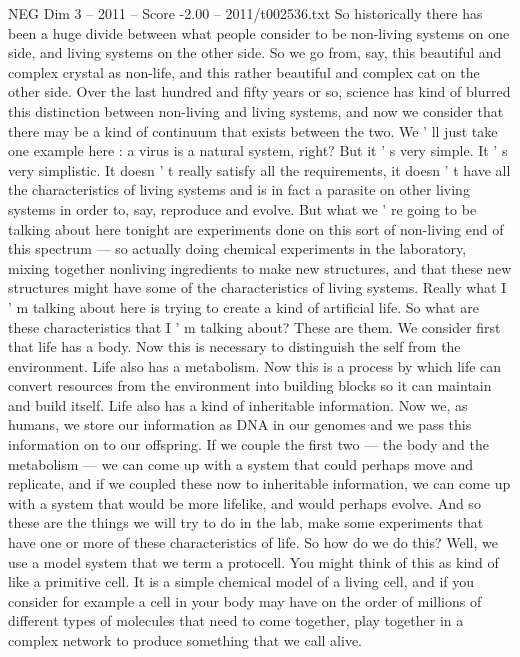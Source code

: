 \begin{textsample}{NEG Dim 3 – 2011 – Score -2.00 – 2011/t002536.txt}  \label{ex:f3_neg_024}
So historically there has been a huge divide between what people consider to be non-living systems on one side, and living systems on the other side.
So we go from, say, this beautiful and complex crystal as non-life, and this rather beautiful and complex cat on the other side.
Over the last hundred and fifty years or so, science has kind of blurred this distinction between non-living and living systems, and now we consider that there may be a kind of continuum that exists between the two.
We ' ll just take one example here : a virus is a natural system, right?
But it ' s very simple.
It ' s very simplistic.
It doesn ' t really satisfy all the requirements, it doesn ' t have all the characteristics of living systems and is in fact a parasite on other living systems in order to, say, reproduce and evolve.
But what we ' re going to be talking about here tonight are experiments done on this sort of non-living end of this spectrum — so actually doing chemical experiments in the laboratory, mixing together nonliving ingredients to make new structures, and that these new structures might have some of the characteristics of living systems.
Really what I ' m talking about here is trying to create a kind of artificial life.
So what are these characteristics that I ' m talking about?
These are them.
We consider first that life has a body.
Now this is necessary to distinguish the self from the environment.
Life also has a metabolism.
Now this is a process by which life can convert resources from the environment into building blocks so it can maintain and build itself.
Life also has a kind of inheritable information.
Now we, as humans, we store our information as DNA in our genomes and we pass this information on to our offspring.
If we couple the first two — the body and the metabolism — we can come up with a system that could perhaps move and replicate, and if we coupled these now to inheritable information, we can come up with a system that would be more lifelike, and would perhaps evolve.
And so these are the things we will try to do in the lab, make some experiments that have one or more of these characteristics of life.
So how do we do this?
Well, we use a model system that we term a protocell.
You might think of this as kind of like a primitive cell.
It is a simple chemical model of a living cell, and if you consider for example a cell in your body may have on the order of millions of different types of molecules that need to come together, play together in a complex network to produce something that we call alive.

\end{textsample}

